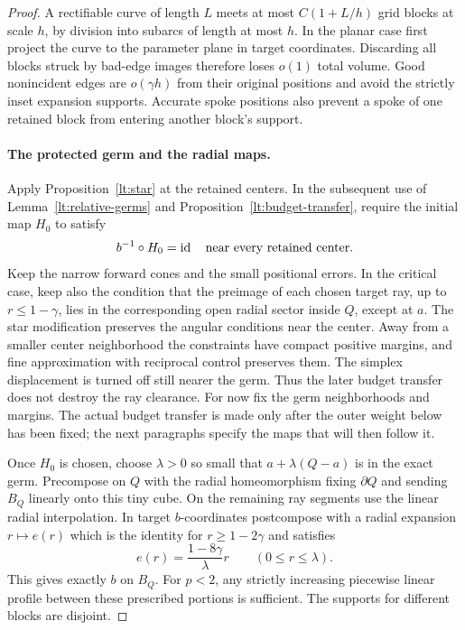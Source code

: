 \documentclass[11pt]{article}
\numberwithin{equation}{section}
\theoremstyle{definition}
\theoremstyle{remark}
\newcommand{\Id}{\operatorname{id}}
\begin{document}
\begin{proof}
A rectifiable curve of length $L$ meets at most $C(1+L/h)$ grid blocks
at scale $h$, by division into subarcs of length at most $h$.  In the
planar case first project the curve to the parameter plane in target
coordinates.  Discarding all blocks struck by bad-edge images
therefore loses $o(1)$ total volume.  Good nonincident edges are
$o(\gamma h)$ from their original positions and avoid the strictly
inset expansion supports.  Accurate spoke positions also prevent a
spoke of one retained block from entering another block's support.

\paragraph{The protected germ and the radial maps.}
Apply Proposition~\ref{lt:star} at the retained centers.  In the
subsequent use of Lemma~\ref{lt:relative-germs} and
Proposition~\ref{lt:budget-transfer}, require the initial map $H_0$
to satisfy
\[
 b^{-1}\circ H_0=\Id\quad\hbox{near every retained center}.
\]
Keep the narrow forward cones and the small positional errors.  In
the critical case, keep also the condition that the preimage of each
chosen target ray, up to $r\le1-\gamma$, lies in the corresponding
open radial sector inside $Q$, except at $a$.  The star modification
preserves the angular conditions near the center.  Away from a
smaller center neighborhood the constraints have compact positive
margins, and fine approximation with reciprocal control preserves
them.  The simplex displacement is turned off still nearer the
germ.  Thus the later budget transfer does not destroy the ray
clearance.  For now fix the germ neighborhoods and margins.  The
actual budget transfer is made only after the outer weight below
has been fixed; the next paragraphs specify the maps that will
then follow it.

Once $H_0$ is chosen, choose $\lambda>0$ so small that $a+\lambda(Q-a)$ is in the exact
germ.  Precompose on $Q$ with the radial homeomorphism fixing
$\partial Q$ and sending $B_Q$ linearly onto this tiny cube.  On the
remaining ray segments use the linear radial interpolation.  In
target $b$-coordinates postcompose with a radial expansion $r\mapsto
e(r)$ which is the identity for $r\ge1-2\gamma$ and satisfies
\[
 e(r)=\frac{1-8\gamma}{\lambda}r\qquad(0\le r\le\lambda).
\]
This gives exactly $b$ on $B_Q$.  For $p<2$, any strictly increasing
piecewise linear profile between these prescribed portions is
sufficient.  The supports for different blocks are disjoint.


\end{proof}
\end{document}
